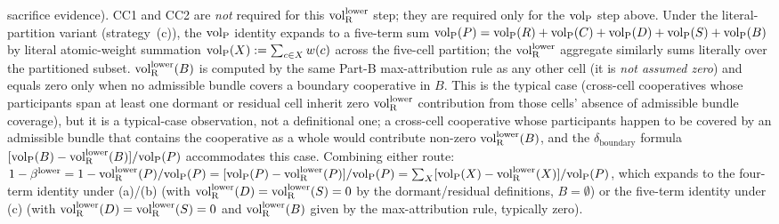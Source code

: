 \begin{definition}
sacrifice evidence).  CC1 and CC2 are
\emph{not} required for this $\volRlower$ step; they are
required only for the $\volL$ step above.  Under the literal-partition
variant (strategy~(c)), the $\volL$ identity expands to a
five-term sum $\volL(P) = \volL(R) + \volL(C) + \volL(D) +
\volL(S) + \volL(B)$ by literal atomic-weight summation
$\volL(X) := \sum_{c \in X} w(c)$ across the
five-cell partition; the $\volRlower$ aggregate similarly
sums literally over the partitioned subset.  $\volRlower(B)$
is computed by the same Part-B max-attribution rule as any
other cell (it is \emph{not assumed zero}) and equals zero
only when no admissible bundle covers a boundary cooperative
in $B$.  This is the typical case (cross-cell cooperatives
whose participants span at least one dormant or residual cell
inherit zero $\volRlower$ contribution from those cells'
absence of admissible bundle coverage), but it is a
typical-case observation, not a definitional one; a
cross-cell cooperative whose participants happen to be covered
by an admissible bundle that contains the cooperative as a
whole would contribute non-zero $\volRlower(B)$, and the
$\delta_{\mathrm{boundary}}$ formula
$[\volL(B) - \volRlower(B)]/\volL(P)$ accommodates this
case.  Combining either route:
$1 - \betaL = 1 - \volRlower(P)/\volL(P) = [\volL(P) -
\volRlower(P)] / \volL(P) = \sum_X [\volL(X) -
\volRlower(X)] / \volL(P)$, which expands to the four-term
identity under (a)/(b) (with $\volRlower(D) = \volRlower(S) =
0$ by the dormant/residual definitions, $B = \emptyset$) or the
five-term identity under (c) (with $\volRlower(D) =
\volRlower(S) = 0$ and $\volRlower(B)$ given by the
max-attribution rule, typically zero).
\end{definition}

